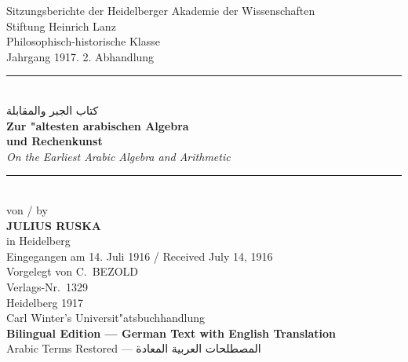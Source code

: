 \documentclass[10pt,a4paper]{article}
\newcommand{\RL}[1]{\beginR#1\endR}
\newcommand{\ar}[1]{{\arabicfont\RL{#1}}}
\begin{document}
\thispagestyle{empty}
\begin{center}
\vspace*{0.5cm}

{\small Sitzungsberichte der Heidelberger Akademie der Wissenschaften\\
Stiftung Heinrich Lanz\\
Philosophisch-historische Klasse\\[0.3em]
Jahrgang 1917. 2. Abhandlung}\\[1cm]

\rule{\textwidth}{1pt}\\[0.5cm]

{\ar{كتاب الجبر والمقابلة} \\[0.3em]
\textcolor{titlecolor}{\Huge\bfseries Zur "altesten arabischen Algebra\\[0.5em]
und Rechenkunst}}\\[0.3cm]

{\large\itshape On the Earliest Arabic Algebra and Arithmetic}\\[0.5cm]
\rule{\textwidth}{1pt}\\[1cm]

{\Large von / by}\\[0.3cm]
{\LARGE\bfseries JULIUS RUSKA}\\[0.3cm]
{\large in Heidelberg}\\[1cm]

{\small Eingegangen am 14. Juli 1916 / Received July 14, 1916}\\
{\small Vorgelegt von C.\ BEZOLD}\\[0.5cm]

{\small Verlags-Nr.\ 1329}\\[0.5cm]

{\large Heidelberg 1917}\\
{\normalsize Carl Winter's Universit"atsbuchhandlung}\\[0.8cm]

{\small\textcolor{germancol}{\textbf{Bilingual Edition — German Text with English Translation}}}\\
{\small Arabic Terms Restored — \ar{المصطلحات العربية المعادة}}
\end{center}
\clearpage

\end{document}
